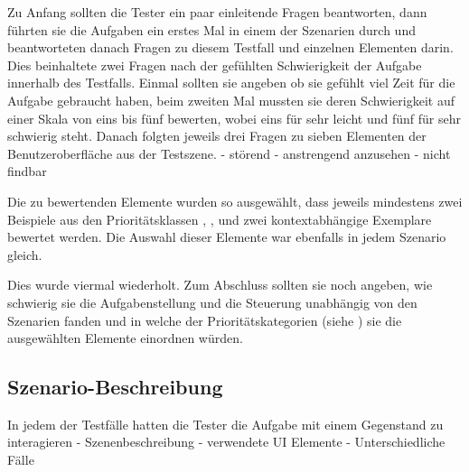 			Zu Anfang sollten die Tester ein paar einleitende Fragen beantworten, dann führten sie die Aufgaben ein erstes Mal in einem der Szenarien durch und beantworteten danach Fragen zu diesem Testfall und einzelnen Elementen darin. 
			Dies beinhaltete zwei Fragen nach der gefühlten Schwierigkeit der Aufgabe innerhalb des Testfalls. Einmal sollten sie angeben ob sie gefühlt viel Zeit für die Aufgabe gebraucht haben, beim zweiten Mal mussten sie deren Schwierigkeit auf einer Skala von eins bis fünf bewerten, wobei eins für sehr leicht und fünf für sehr schwierig steht.
			Danach folgten jeweils drei Fragen zu sieben Elementen der Benutzeroberfläche aus der Testszene.
			- störend - anstrengend anzusehen - nicht findbar
			
			Die zu bewertenden Elemente wurden so ausgewählt, dass jeweils mindestens zwei Beispiele aus den Prioritätsklassen , ,  und zwei kontextabhängige Exemplare bewertet werden.
			Die Auswahl dieser Elemente war ebenfalls in jedem Szenario gleich.
			
			Dies wurde viermal wiederholt. Zum Abschluss sollten sie noch angeben, wie schwierig sie die Aufgabenstellung und die Steuerung unabhängig von den Szenarien fanden und in welche der Prioritätskategorien (siehe ) sie die ausgewählten Elemente einordnen würden.
		
		\subsection{Szenario-Beschreibung}
			In jedem der Testfälle hatten die Tester die Aufgabe mit einem Gegenstand zu interagieren
			- Szenenbeschreibung
			- verwendete UI Elemente
			- Unterschiedliche Fälle
		